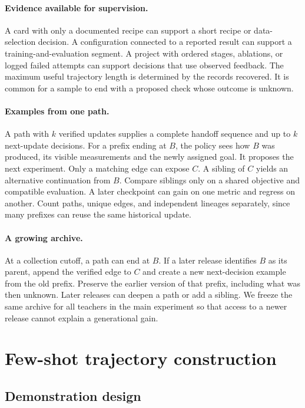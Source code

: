 \documentclass{article}
\begin{document}
\paragraph{Evidence available for supervision.}
A card with only a documented recipe can support a short recipe or data-selection decision. A configuration connected to a reported result can support a training-and-evaluation segment. A project with ordered stages, ablations, or logged failed attempts can support decisions that use observed feedback. The maximum useful trajectory length is determined by the records recovered. It is common for a sample to end with a proposed check whose outcome is unknown.

\paragraph{Examples from one path.}
A path with \(k\) verified updates supplies a complete handoff sequence and up to \(k\) next-update decisions. For a prefix ending at \(B\), the policy sees how \(B\) was produced, its visible measurements and the newly assigned goal. It proposes the next experiment. Only a matching edge can expose \(C\). A sibling of \(C\) yields an alternative continuation from \(B\). Compare siblings only on a shared objective and compatible evaluation. A later checkpoint can gain on one metric and regress on another. Count paths, unique edges, and independent lineages separately, since many prefixes can reuse the same historical update.

\paragraph{A growing archive.}
At a collection cutoff, a path can end at \(B\). If a later release identifies \(B\) as its parent, append the verified edge to \(C\) and create a new next-decision example from the old prefix. Preserve the earlier version of that prefix, including what was then unknown. Later releases can deepen a path or add a sibling. We freeze the same archive for all teachers in the main experiment so that access to a newer release cannot explain a generational gain.

\section{Few-shot trajectory construction}
\label{sec:construction}

\subsection{Demonstration design}
\end{document}
